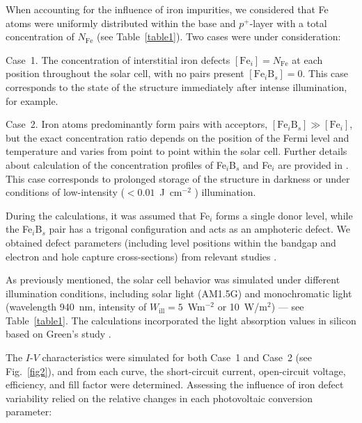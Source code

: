 \documentclass[a4paper,fleqn]{cas-sc}
\begin{document}
When accounting for the influence of iron impurities,
we considered that Fe atoms were uniformly distributed within the base and $p^+$-layer
with a total concentration of $N_\mathrm{Fe}$ (see Table~\ref{table1}).
Two cases were under consideration:

Case~1.
The concentration of interstitial iron defects $\left[\mathrm{Fe}_i\right]=N_\mathrm{Fe}$  at each position throughout the solar cell,
with no pairs present $\left[\mathrm{Fe}_i\mathrm{B}_s\right]=0$.
This case corresponds to the state of the structure immediately after intense illumination, for example.

Case~2.
Iron atoms predominantly form pairs with acceptors, $\left[\mathrm{Fe}_i\mathrm{B}_s\right] \gg \left[\mathrm{Fe}_i\right]$,
but the exact concentration ratio depends on the position of the Fermi level and temperature \cite{FeB:kinetic,MurphyJAP2011}
and varies from point to point within the solar cell.
Further details about calculation of the concentration profiles of Fe$_i$B$_s$ and Fe$_i$ are provided in \cite{Olikh2022PPV,Olikh2019SM}.
This case corresponds to prolonged storage of the structure in darkness or under conditions of low-intensity ($< 0.01$~J~cm$^{-2}$ \cite{Macdonald2004}) illumination.


During the calculations, it was assumed that Fe$_i$ forms a single donor level,
while the Fe$_i$B$_s$ pair has a trigonal configuration and acts as an amphoteric defect.
We obtained defect parameters (including level positions within the bandgap and electron and hole capture cross-sections) from relevant studies \cite{ROUGIEUX2018,Istratov1999,Paudyal}.

As previously mentioned, the solar cell behavior was simulated under different illumination conditions,
including solar light (AM1.5G) and monochromatic light (wavelength 940~nm, intensity of $W_\mathrm{ill} = 5$~Wm$^{-2}$ or 10~W/$\mathrm{m}^{2}$) --– see Table~\ref{table1}.
The calculations incorporated the light absorption values in silicon based on Green's study \cite{Green2022}.


The $I$-$V$ characteristics were simulated for both Case~1 and Case~2 (see Fig.~\ref{fig2}),
and from each curve, the short-circuit current, open-circuit voltage, efficiency, and fill factor were determined.
Assessing the influence of iron defect variability relied on the relative changes in each photovoltaic conversion parameter:
\end{document}
